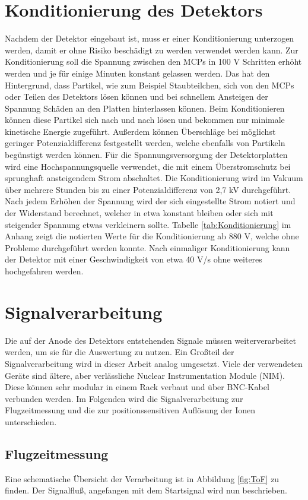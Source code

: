 \section{Konditionierung des Detektors}
Nachdem der Detektor eingebaut ist, muss er einer Konditionierung unterzogen werden, damit er ohne Risiko beschädigt zu werden verwendet werden kann. Zur Konditionierung soll die Spannung zwischen den MCPs in 100 V Schritten erhöht werden und je für einige Minuten konstant gelassen werden. Das hat den Hintergrund, dass Partikel, wie zum Beispiel Staubteilchen, sich von den MCPs oder Teilen des Detektors lösen können und bei schnellem Ansteigen der Spannung Schäden an den Platten hinterlassen können. Beim Konditionieren können diese Partikel sich nach und nach lösen und bekommen nur minimale kinetische Energie zugeführt. Außerdem können Überschläge bei möglichst geringer Potenzialdifferenz festgestellt werden, welche ebenfalls von Partikeln begünstigt werden können. Für die Spannungsversorgung der Detektorplatten wird eine Hochspannungsquelle verwendet, die mit einem Überstromschutz bei sprunghaft ansteigendem Strom abschaltet. Die Konditionierung wird im Vakuum über mehrere Stunden bis zu einer Potenzialdifferenz von 2,7 kV durchgeführt. Nach jedem Erhöhen der Spannung wird der sich eingestellte Strom notiert und der Widerstand berechnet, welcher in etwa konstant bleiben oder sich mit steigender Spannung etwas verkleinern sollte. Tabelle \ref{tab:Konditionierung} im Anhang zeigt die notierten Werte für die Konditionierung ab 880 V, welche ohne Probleme durchgeführt werden konnte. Nach einmaliger Konditionierung kann der Detektor mit einer Geschwindigkeit von etwa 40 V/s ohne weiteres hochgefahren werden.

\section{Signalverarbeitung}
Die auf der Anode des Detektors entstehenden Signale müssen weiterverarbeitet werden, um sie für die Auswertung zu nutzen. Ein Großteil der Signalverarbeitung wird in dieser Arbeit analog umgesetzt. Viele der verwendeten Geräte sind ältere, aber verlässliche Nuclear Instrumentation Module (NIM). Diese können sehr modular in einem Rack verbaut und über BNC-Kabel verbunden werden. Im Folgenden wird die Signalverarbeitung zur Flugzeitmessung und die zur positionssensitiven Auflösung der Ionen unterschieden.

\subsection{Flugzeitmessung}
Eine schematische Übersicht der Verarbeitung ist in Abbildung \ref{fig:ToF} zu finden. Der Signalfluß, angefangen mit dem Startsignal wird nun beschrieben.

